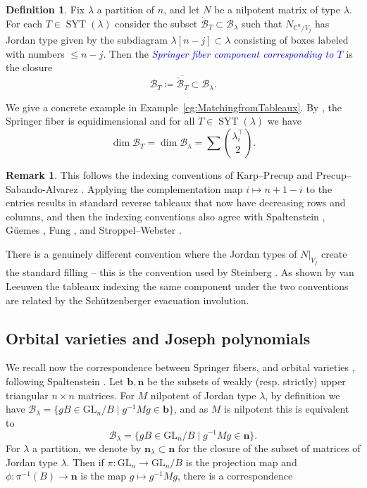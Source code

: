 \documentclass[11pt]{amsart}
\theoremstyle{definition}
\newtheorem{defn}[thm]{Definition}
\newtheorem{rem}[thm]{Remark}
\numberwithin{equation}{section}
\newcommand{\suchthat}{\;|\;}
\newcommand{\GL}{\mathrm{GL}}
\renewcommand\emph[1]{\textcolor{blue}{\textit{#1}}} %
\newcommand{\syt}{\operatorname{SYT}} %
\begin{document}
\begin{defn}\label{def:springer_fiber_component}
    Fix $\lambda$ a partition of $n$, and let $N$ be a nilpotent matrix of type $\lambda$.
    For each $T\in \syt(\lambda)$ consider the subset $\mathring{\mathcal{B}}_T\subset \mathcal{B}_\lambda$ such that $N_{\mathbb{C}^n/V_{j}}$ has Jordan type given by the subdiagram $\lambda[n-j]\subset \lambda$ consisting of boxes labeled with numbers $\le n-j$. Then the \emph{Springer fiber component corresponding to $T$} is the closure $$\mathcal{B}_T\coloneqq \overline{\mathring{\mathcal{B}}_T}\subset \mathcal{B}_\lambda.$$
\end{defn}
We give a concrete example in Example~\ref{eg:MatchingfromTableaux}.
By \cite{Spa77}, the Springer fiber is equidimensional  and for all $T\in \syt(\lambda)$ we have
$$\dim \mathcal{B}_T=\dim \mathcal{B}_\lambda=\sum \binom{\lambda_i^{\top}}{2}.$$

\begin{rem}
\label{rem:differentconv}
   This follows the indexing conventions of Karp--Precup \cite{karp2025richardsontableauxcomponentsspringer} and Precup--Sabando-Alvarez \cite{sabandoalvarez2026idealsdefiningcomponentstworow}.
   Applying the complementation map $i\mapsto  n+1-i$ to the entries results in standard reverse tableaux that now have decreasing rows and columns, and then the indexing conventions also agree with Spaltenstein \cite{Spa76}, G\"uemes \cite{Gu89}, Fung \cite{Fun03}, and Stroppel--Webster \cite{SW12}.

   There is a genuinely different convention where the Jordan types of $N|_{V_j}$ create the standard filling -- this is the convention used by Steinberg \cite{St88}.
   As shown by van Leeuwen \cite{Vl00} the tableaux indexing the same component under the two conventions are related by the Sch\"utzenberger evacuation involution.
\end{rem}

\subsection{Orbital varieties and Joseph polynomials}
We recall now the correspondence between Springer fibers, and orbital varieties \cite{Jo84,Jo89,KZJ14,RTVZJ12}, following Spaltenstein \cite{Spa77}. Let $\bm{b},\bm{n}$ be the subsets of weakly (resp. strictly) upper triangular $n\times n$ matrices.
For $M$ nilpotent of Jordan type $\lambda$,
by definition we have $\mathcal{B}_\lambda=\{gB\in \GL_n/B\suchthat g^{-1}Mg\in \bm{b}\}$, and as $M$ is nilpotent this is equivalent to
$$\mathcal{B}_\lambda=\{gB\in \GL_n/B\suchthat g^{-1}Mg\in \bm{n}\}.$$
For $\lambda$ a partition, we denote by $\bm{n}_{\lambda}\subset \bm{n}$ for the closure of the subset of matrices of Jordan type $\lambda$.
Then if $\pi:\GL_n\to \GL_n/B$ is the projection map and $\phi:\pi^{-1}(B)\to \bm{n}$ is the map $g\mapsto g^{-1}Mg$, there is a correspondence
\end{document}

